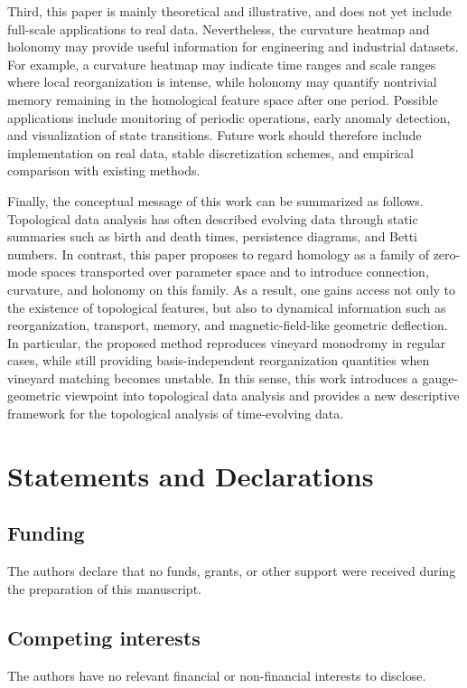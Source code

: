 \documentclass[pdflatex,sn-mathphys-num]{sn-jnl}%
\theoremstyle{thmstyleone}%
\theoremstyle{thmstyletwo}%
\theoremstyle{thmstylethree}%
\begin{document}
Third, this paper is mainly theoretical and illustrative, and does not yet include full-scale applications to real data. Nevertheless, the curvature heatmap and holonomy may provide useful information for engineering and industrial datasets. For example, a curvature heatmap may indicate time ranges and scale ranges where local reorganization is intense, while holonomy may quantify nontrivial memory remaining in the homological feature space after one period. Possible applications include monitoring of periodic operations, early anomaly detection, and visualization of state transitions. Future work should therefore include implementation on real data, stable discretization schemes, and empirical comparison with existing methods.

Finally, the conceptual message of this work can be summarized as follows. Topological data analysis has often described evolving data through static summaries such as birth and death times, persistence diagrams, and Betti numbers. In contrast, this paper proposes to regard homology as a family of zero-mode spaces transported over parameter space and to introduce connection, curvature, and holonomy on this family. As a result, one gains access not only to the existence of topological features, but also to dynamical information such as reorganization, transport, memory, and magnetic-field-like geometric deflection. In particular, the proposed method reproduces vineyard monodromy in regular cases, while still providing basis-independent reorganization quantities when vineyard matching becomes unstable. In this sense, this work introduces a gauge-geometric viewpoint into topological data analysis and provides a new descriptive framework for the topological analysis of time-evolving data.

\section*{Statements and Declarations}

\subsection*{Funding}
The authors declare that no funds, grants, or other support were received during the preparation of this manuscript.

\subsection*{Competing interests}
The authors have no relevant financial or non-financial interests to disclose.
\end{document}
